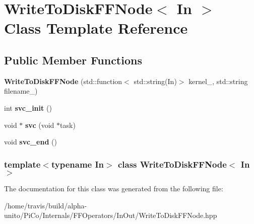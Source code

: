 \hypertarget{class_write_to_disk_f_f_node}{\section{\-Write\-To\-Disk\-F\-F\-Node$<$ \-In $>$ \-Class \-Template \-Reference}
\label{class_write_to_disk_f_f_node}
}
\subsection*{\-Public \-Member \-Functions}
\begin{DoxyCompactItemize}
\item 
\hypertarget{class_write_to_disk_f_f_node_a5b3fa001c7bf954ca01e9e45652f38cf}{{\bfseries \-Write\-To\-Disk\-F\-F\-Node} (std\-::function$<$ std\-::string(\-In)$>$ kernel\-\_\-, std\-::string filename\-\_\-)}\label{class_write_to_disk_f_f_node_a5b3fa001c7bf954ca01e9e45652f38cf}

\item 
\hypertarget{class_write_to_disk_f_f_node_adbb0f820e3e4168e3881e57e6fffb047}{int {\bfseries svc\-\_\-init} ()}\label{class_write_to_disk_f_f_node_adbb0f820e3e4168e3881e57e6fffb047}

\item 
\hypertarget{class_write_to_disk_f_f_node_abfac53a07fd79196f8f84acc05f14122}{void $\ast$ {\bfseries svc} (void $\ast$task)}\label{class_write_to_disk_f_f_node_abfac53a07fd79196f8f84acc05f14122}

\item 
\hypertarget{class_write_to_disk_f_f_node_a6c3c04a03f899fd788ebd5895c1f42cc}{void {\bfseries svc\-\_\-end} ()}\label{class_write_to_disk_f_f_node_a6c3c04a03f899fd788ebd5895c1f42cc}

\end{DoxyCompactItemize}
\subsubsection*{template$<$typename \-In$>$ class Write\-To\-Disk\-F\-F\-Node$<$ In $>$}



\-The documentation for this class was generated from the following file\-:\begin{DoxyCompactItemize}
\item 
/home/travis/build/alpha-\/unito/\-Pi\-Co/\-Internals/\-F\-F\-Operators/\-In\-Out/\-Write\-To\-Disk\-F\-F\-Node.\-hpp\end{DoxyCompactItemize}
